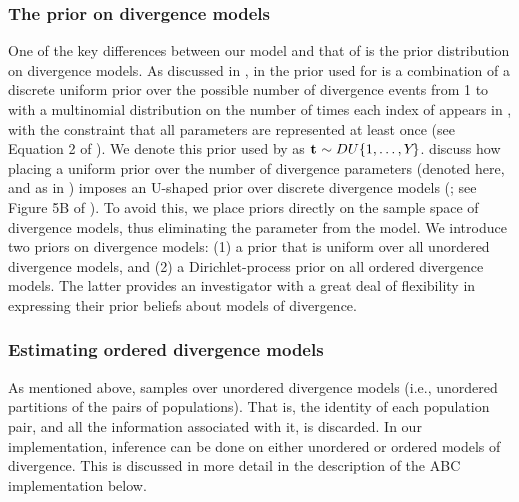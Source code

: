 \subsubsection*{The prior on divergence models}
One of the key differences between our model and that of \msb \citep{Huang2011}
is the prior distribution on divergence models.
As discussed in \citet{Oaks2012}, in \msb the prior used for
\divTimeIndexVector is a combination of a discrete uniform prior over the
possible number of divergence events \divTimeNum from 1 to \npairs{} with a
multinomial distribution on the number of times each index of \divTimeVector
appears in \divTimeIndexVector, with the constraint that all \divTime{}
parameters are represented at least once (see Equation 2 of \citet{Oaks2012}).
We denote this prior used by \msb as $\mathbf{t_{}} \sim DU\{1, \ldots, Y_{}\}$.
\citet{Oaks2012} discuss how placing a uniform prior over the number of
divergence parameters (denoted \divTimeNum here, and as \numt{} in
\citet{Huang2011}) imposes an U-shaped prior over discrete divergence
models (\divTimeIndexVector; see
Figure 5B of \citet{Oaks2012}).
To avoid this, we place priors directly on the sample space of divergence
models, thus eliminating the parameter \numt{} from the model.
We introduce two priors on divergence models:
(1) a prior that is uniform over all unordered divergence models, and
(2) a Dirichlet-process prior on all ordered divergence models.
The latter provides an investigator with a great deal of flexibility in
expressing their prior beliefs about models of divergence.

\subsubsection*{Estimating ordered divergence models}
As mentioned above, \msb samples over unordered divergence models
(i.e., unordered partitions of the \npairs{} pairs of populations).
That is, the identity of each population pair, and all the information
associated with it, is discarded.
In our implementation, inference can be done on either unordered or ordered
models of divergence.
This is discussed in more detail in the description of the ABC implementation
below.

